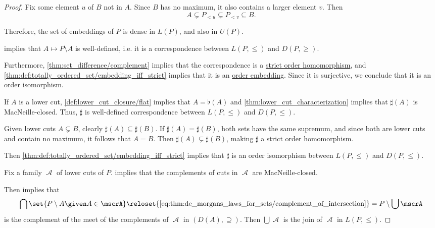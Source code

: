 \begin{proof}
  Fix some element \( u \) of \( B \) not in \( A \). Since \( B \) has no maximum, it also contains a larger element \( v \). Then
  \begin{equation*}
    A \subsetneq P_{< u} \subsetneq P_{< v} \subseteq B.
  \end{equation*}

  Therefore, the set of embeddings of \( P \) is dense in \( L(P) \), and also in \( U(P) \).

    implies that \( A \mapsto P \setminus A \) is well-defined, i.e. it is a correspondence between \( L(P, \leq) \) and \( D(P, \geq) \).

  Furthermore, \cref{thm:set_difference/complement} implies that the correspondence is a \hyperref[def:partially_ordered_set/morphism]{strict order homomorphism}, and \cref{thm:def:totally_ordered_set/embedding_iff_strict} implies that it is an \hyperref[def:partially_ordered_set/morphism]{order embedding}. Since it is surjective, we conclude that it is an order isomorphism.

   If \( A \) is a lower cut, \cref{def:lower_cut_closure/flat} implies that \( A = \flat(A) \) and \cref{thm:lower_cut_characterization} implies that \( \sharp(A) \) is MacNeille-closed. Thus, \( \sharp \) is well-defined correspondence between \( L(P, \leq) \) and \( D(P, \leq) \).

  Given lower cuts \( A \subsetneq B \), clearly \( \sharp(A) \subseteq \sharp(B) \). If \( \sharp(A) = \sharp(B) \), both sets have the same supremum, and since both are lower cuts and contain no maximum, it follows that \( A = B \). Then \( \sharp(A) \subsetneq \sharp(B) \), making \( \sharp \) a strict order homomorphism.

  Then \cref{thm:def:totally_ordered_set/embedding_iff_strict} implies that \( \sharp \) is an order isomorphism between \( L(P, \leq) \) and \( D(P, \leq) \).

   Fix a family \( \mscrA \) of lower cuts of \( P \).  implies that the complements of cuts in \( \mscrA \) are MacNeille-closed.

  Then  implies that
  \begin{equation*}
    \bigcap \set{ P \setminus A \given A \in \mscrA }
    \reloset {\eqref{eq:thm:de_morgans_laws_for_sets/complement_of_intersection}} =
    P \setminus \bigcup \mscrA
  \end{equation*}
  is the complement of the meet of the complements of \( \mscrA \) in \( (D(A), \supseteq) \). Then \( \bigcup \mscrA \) is the join of \( \mscrA \) in \( L(P, \leq) \).


\end{proof}
